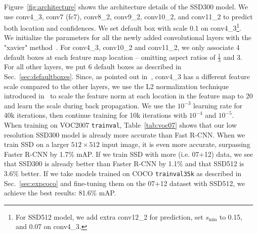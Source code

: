 \documentclass[runningheads]{llncs}
\begin{document}
Figure~\ref{fig:architecture} shows the architecture details of the SSD300 model. We use conv4\_3, conv7 (fc7), conv8\_2, conv9\_2, conv10\_2, and conv11\_2 to predict both location and confidences. We set default box with scale 0.1 on conv4\_3\footnote{For SSD512 model, we add extra conv12\_2 for prediction, set $s_\text{min}$ to 0.15, and 0.07 on conv4\_3.}. We initialize the parameters for all the newly added convolutional layers with the "xavier" method~\cite{glorot2010understanding}. For conv4\_3, conv10\_2 and conv11\_2, we only associate 4 default boxes at each feature map location -- omitting aspect ratios of $\frac{1}{3}$ and 3. For all other layers, we put 6 default boxes as described in Sec.~\ref{sec:defaultboxes}. Since, as pointed out in~\cite{liu2015parsenet}, conv4\_3 has a different feature scale compared to the other layers, we use the L2 normalization technique introduced in~\cite{liu2015parsenet} to scale the feature norm at each location in the feature map to 20 and learn the scale during back propagation. We use the $10^{-3}$ learning rate for 40k iterations, then continue training for 10k iterations with $10^{-4}$ and $10^{-5}$. When training on VOC2007 \texttt{trainval}, Table~\ref{tab:voc07} shows that our low resolution SSD300 model is already more accurate than Fast R-CNN. When we train SSD on a larger $512\times 512$ input image, it is even more accurate, surpassing Faster R-CNN by 1.7\% mAP. If we train SSD with more (i.e. 07+12) data, we see that SSD300 is already better than Faster R-CNN by 1.1\% and that SSD512 is 3.6\% better. If we take models trained on COCO \texttt{trainval35k} as described in Sec.~\ref{sec:expcoco} and fine-tuning them on the 07+12 dataset with SSD512, we achieve the best results: 81.6\% mAP.
\end{document}
